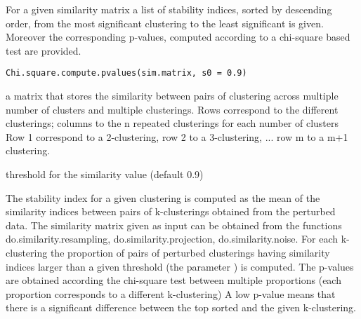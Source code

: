 \documentclass{article}
\begin{document}
\begin{Description}\relax
For a given similarity matrix a list of stability indices, sorted by descending order, from the most significant
clustering to the least significant is given. Moreover the corresponding p-values, computed according to a chi-square based test are provided.
\end{Description}
\begin{Usage}
\begin{verbatim}
Chi.square.compute.pvalues(sim.matrix, s0 = 0.9)
\end{verbatim}
\end{Usage}
\begin{Arguments}
\begin{ldescription}
\item[\code{sim.matrix}] a matrix that stores the similarity between pairs of clustering across multiple number of clusters
and multiple clusterings. Rows correspond to the different clusterings; columns to the n repeated clusterings for each number of clusters
Row 1 correspond to a 2-clustering, row 2 to a 3-clustering, ... row m to a m+1 clustering. 
\item[\code{s0}] threshold for the similarity value (default 0.9) 
\end{ldescription}
\end{Arguments}
\begin{Details}\relax
The stability index for a given clustering is computed as the mean of the similarity indices between pairs of 
k-clusterings obtained from the perturbed data. The similarity matrix given as input can be obtained from the functions
do.similarity.resampling, do.similarity.projection, do.similarity.noise. For each k-clustering the proportion
of pairs of perturbed clusterings having similarity indices larger than a given threshold (the parameter ) is computed.
The p-values are obtained according the chi-square test between multiple proportions (each proportion corresponds to a different k-clustering) 
A low p-value means that there is a significant difference between the top sorted and the given k-clustering.
\end{Details}
\end{document}

